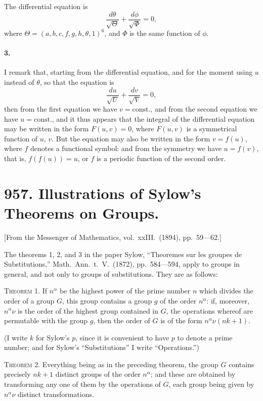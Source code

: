 \documentclass[11pt,a4paper]{book}
\providecommand{\between}{,}
\begin{document}
{{{The differential equation is
\[
\frac{d\theta}{\sqrt{\Theta}} + \frac{d\phi}{\sqrt{\Phi}} = 0,
\]
where $\Theta = (a, b, c, f, g, h\between\theta, 1)^6$, and $\Phi$ is the same function of $\phi$.

\paragraph{3.} I remark that, starting from the differential equation, and for the moment using $u$ instead of $\theta$, so that the equation is
\[
\frac{du}{\sqrt{U}} + \frac{dv}{\sqrt{V}} = 0,
\]
then from the first equation we have $v = \text{const.}$, and from the second equation we have $u = \text{const.}$, and it thus appears that the integral of the differential equation may be written in the form $F(u, v) = 0$, where $F(u, v)$ is a symmetrical function of $u$, $v$. But the equation may also be written in the form $v = f(u)$, where $f$ denotes a functional symbol: and from the symmetry we have $u = f(v)$, that is, $f(f(u)) = u$, or $f$ is a periodic function of the second order.

\newpage

\section*{957. Illustrations of Sylow's Theorems on Groups.}

[From the Messenger of Mathematics, vol.~xxIII.~(1894), pp.~59---62.]

\bigskip

The theorems 1, 2, and 3 in the paper Sylow, ``Theoremes sur les groupes de Substitutions,'' Math.~Ann.~t.~V.~(1872), pp.~584---594, apply to groups in general, and not only to groups of substitutions. They are as follows:

\textsc{Theorem 1.} If $n^\alpha$ be the highest power of the prime number $n$ which divides the order of a group $G$, this group contains a group $g$ of the order $n^\alpha$: if, moreover, $n^\alpha\nu$ is the order of the highest group contained in $G$, the operations whereof are permutable with the group $g$, then the order of $G$ is of the form $n^\alpha\nu(nk+1)$.

(I write $k$ for Sylow's $p$, since it is convenient to have $p$ to denote a prime number; and for Sylow's ``Substitutions'' I write ``Operations.'')

\textsc{Theorem 2.} Everything being as in the preceding theorem, the group $G$ contains precisely $nk+1$ distinct groups of the order $n^\alpha$; and these are obtained by transforming any one of them by the operations of $G$, each group being given by $n^\alpha\nu$ distinct transformations.

}}}
\end{document}
